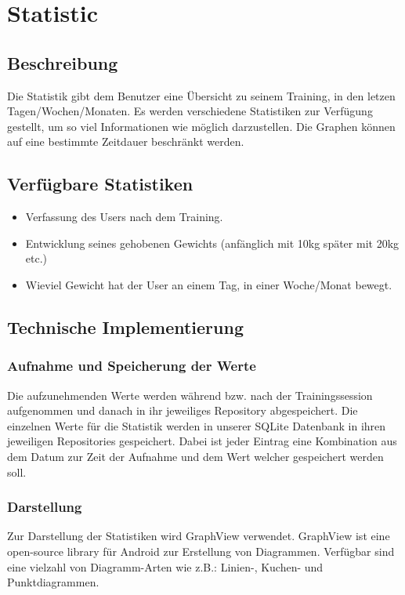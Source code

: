 \documentclass[FIPLY_base.tex]{subfiles}
\author{Gerald Irsiegler}
\date{26. Februar 2016}
\begin{document}
\section{Statistic}

\subsection{Beschreibung}
Die Statistik gibt dem Benutzer eine Übersicht zu seinem Training, in den letzen Tagen/Wochen/Monaten. 
Es werden verschiedene Statistiken zur Verfügung gestellt, um so viel Informationen wie möglich darzustellen.
Die Graphen können auf eine bestimmte Zeitdauer beschränkt werden.


\subsection{Verfügbare Statistiken}
\begin{itemize}
\item Verfassung des Users nach dem Training.
\item Entwicklung seines gehobenen Gewichts (anfänglich mit 10kg später mit 20kg etc.)
\item Wieviel Gewicht hat der User an einem Tag, in einer Woche/Monat bewegt.
\end{itemize}

\subsection{Technische Implementierung}
\subsubsection{Aufnahme und Speicherung der Werte}
Die aufzunehmenden Werte werden während bzw. nach der Trainingssession aufgenommen und danach in ihr jeweiliges Repository abgespeichert.
Die einzelnen Werte für die Statistik werden in unserer SQLite Datenbank in ihren jeweiligen Repositories gespeichert.
Dabei ist jeder Eintrag eine Kombination aus dem Datum zur Zeit der Aufnahme und dem Wert welcher gespeichert werden soll.

\subsubsection{Darstellung}
Zur Darstellung der Statistiken wird GraphView verwendet. GraphView ist eine open-source library für Android zur Erstellung von Diagrammen.
Verfügbar sind eine vielzahl von Diagramm-Arten wie z.B.: Linien-, Kuchen- und Punktdiagrammen.
\end{document}
